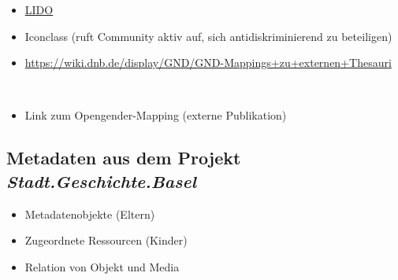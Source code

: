 \documentclass[
  letterpaper,
  DIV=11,
  numbers=noendperiod]{scrartcl}
\providecommand{\tightlist}{%
  \setlength{\itemsep}{0pt}\setlength{\parskip}{0pt}}\usepackage{longtable,booktabs,array}
\begin{document}
\begin{itemize}
\tightlist
\item
  \href{https://terminology-view.lido-schema.org/vocnet/?startNode=lido00409&lang=en&uriVocItem=http://terminology.lido-schema.org/eventType}{LIDO}
\item
  Iconclass (ruft Community aktiv auf, sich antidiskriminierend zu
  beteiligen)\\
\item
  \url{https://wiki.dnb.de/display/GND/GND-Mappings+zu+externen+Thesauri}\strut \\
\item
  Link zum Opengender-Mapping (externe Publikation)
\end{itemize}

\subsection{\texorpdfstring{Metadaten aus dem Projekt
\emph{Stadt.Geschichte.Basel}}{Metadaten aus dem Projekt Stadt.Geschichte.Basel}}\label{metadaten-aus-dem-projekt-stadt.geschichte.basel}

\begin{tcolorbox}[enhanced jigsaw, colbacktitle=quarto-callout-tip-color!10!white, rightrule=.15mm, coltitle=black, left=2mm, opacitybacktitle=0.6, toptitle=1mm, title=\textcolor{quarto-callout-tip-color}{\faLightbulb}\hspace{0.5em}{Erfahrungen Stadt.Geschichte.Basel}, colback=white, colframe=quarto-callout-tip-color-frame, opacityback=0, titlerule=0mm, leftrule=.75mm, breakable, bottomtitle=1mm, bottomrule=.15mm, arc=.35mm, toprule=.15mm]

\begin{itemize}
\tightlist
\item
  Metadatenobjekte (Eltern)\\
\item
  Zugeordnete Ressourcen (Kinder)
\item
  Relation von Objekt und Media\\
\end{itemize}

\end{tcolorbox}
\end{document}
